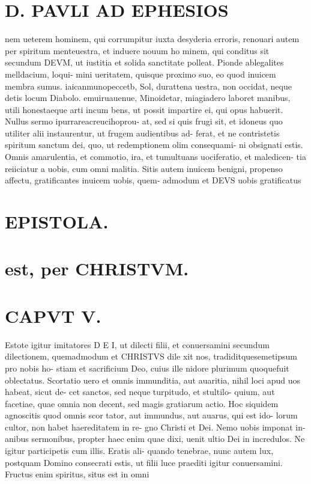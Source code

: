 \documentclass{article}
\begin{document}
\begin{pages}
\section*{D. PAVLI AD EPHESIOS }
\marginpar{[ p.8. ]}
\marginpar{[ p.9.  ]}
\marginpar{[ p.10.  ]}
\marginpar{[ p.11.  ]}
\marginpar{[ p.12.  ]}
\marginpar{[ p.13.  ]}\pstart nem ueterem hominem, qui corrumpitur iuxta desyderia erroris, renouari autem per spiritum menteuestra, et induere nouum ho minem, qui conditus sit secundum DEVM, ut iustitia et solida sanctitate polleat.  \pend\pstart Pionde ablegalites melldacium, loqui- mini ueritatem, quisque proximo suo, eo quod inuicem membra sumus.  \pend\pstart iaicanmunopeccetb, Sol, durattena uestra, non occidat, neque detis locum Diabolo.  \pend\pstart emuiruauenue, Minoidetar, miagiadero laboret manibus, utili honestaeque arti incum bens, ut possit impartire ei, qui opus habuerit.  \pend\pstart Nullus sermo ipurrareacreucihoprou- at, sed si quis frugi sit, et idoneus quo utiliter alii instaurentur, ut frugem audientibus ad- ferat, et ne contristetis spiritum sanctum dei, quo, ut redemptionem olim consequami- ni obsignati estis.  \pend\pstart Omnis amarulentia, et commotio,  ira, et tumultuans uociferatio, et maledicen- tia reiiciatur a uobis, cum omni malitia.  \pend\pstart Sitis autem inuicem benigni, propenso affectu, gratificantes inuicem uobis, quem- admodum et DEVS uobis gratificatus  \pend
\section*{EPISTOLA.  }
\section*{est, per CHRISTVM.  }
\marginpar{[ p.u ]}
\marginpar{[ p.1.  ]}
\marginpar{[ p.2.  ]}
\marginpar{[ p.3.  ]}
\marginpar{[ p.4.  ]}
\marginpar{[ p.5.  ]}
\endnumbering\beginnumbering\section{CAPVT V. }\pstart Estote igitur imitatores D E I, ut dilecti filii, et conuersamini secundum dilectionem, quemadmodum et CHRISTVS dile xit nos, tradiditquesemetipsum pro nobis ho- stiam et sacrificium Deo, cuius ille nidore plurimum quoquefuit oblectatus.  \pend\pstart Scortatio uero et omnis immunditia, aut auaritia, nihil loci apud uos habeat, sicut de- cet sanctos, sed neque turpitudo, et stultilo- quium, aut facetiae, quae omnia non decent, sed magis gratiarum actio.  \pend\pstart Hoc siquidem agnoscitis quod omnis scor tator, aut immundus, aut auarus, qui est ido- lorum cultor, non habet haereditatem in re- gno Christi et Dei. Nemo uobis imponat in- anibus sermonibus, propter haec enim quae dixi, uenit ultio Dei in incredulos.  \pend\pstart Ne igitur participetis cum illis. Eratis ali- quando tenebrae, nunc autem lux, postquam Domino consecrati estis, ut filii luce praediti igitur conuersamini.  \pend\pstart Fructus enim spiritus, situs est in omni  \pend

\end{pages}
\end{document}
